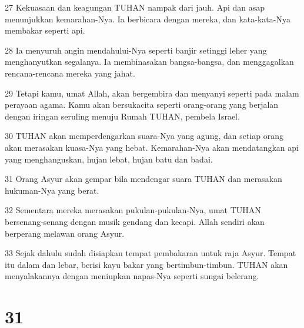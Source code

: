 \par 27 Kekuasaan dan keagungan TUHAN nampak dari jauh. Api dan asap menunjukkan kemarahan-Nya. Ia berbicara dengan mereka, dan kata-kata-Nya membakar seperti api.
\par 28 Ia menyuruh angin mendahului-Nya seperti banjir setinggi leher yang menghanyutkan segalanya. Ia membinasakan bangsa-bangsa, dan menggagalkan rencana-rencana mereka yang jahat.
\par 29 Tetapi kamu, umat Allah, akan bergembira dan menyanyi seperti pada malam perayaan agama. Kamu akan bersukacita seperti orang-orang yang berjalan dengan iringan seruling menuju Rumah TUHAN, pembela Israel.
\par 30 TUHAN akan memperdengarkan suara-Nya yang agung, dan setiap orang akan merasakan kuasa-Nya yang hebat. Kemarahan-Nya akan mendatangkan api yang menghanguskan, hujan lebat, hujan batu dan badai.
\par 31 Orang Asyur akan gempar bila mendengar suara TUHAN dan merasakan hukuman-Nya yang berat.
\par 32 Sementara mereka merasakan pukulan-pukulan-Nya, umat TUHAN bersenang-senang dengan musik gendang dan kecapi. Allah sendiri akan berperang melawan orang Asyur.
\par 33 Sejak dahulu sudah disiapkan tempat pembakaran untuk raja Asyur. Tempat itu dalam dan lebar, berisi kayu bakar yang bertimbun-timbun. TUHAN akan menyalakannya dengan meniupkan napas-Nya seperti sungai belerang.

\chapter{31}


